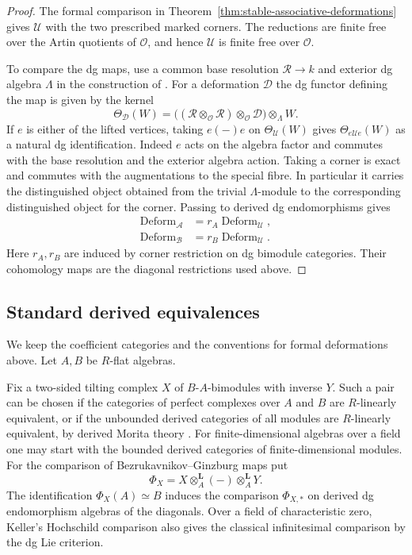 \documentclass[12pt,a4paper,english,reqno]{amsart}
\numberwithin{equation}{section}
\theoremstyle{plain}
\theoremstyle{definition}
\begin{document}
\begin{proof}
The formal comparison in Theorem~\ref{thm:stable-associative-deformations}
gives $\mathcal U$ with the two prescribed marked corners.
The reductions are finite free over the Artin quotients of
$\mathcal O$, and hence $\mathcal U$ is finite free over
$\mathcal O$.

To compare the dg maps, use a common base resolution
$\mathcal R\to k$ and exterior dg algebra $\Lambda$ in the
construction of \cite[(3.1.4)--(3.1.6)]{BezrukavnikovGinzburg2007}.
For a deformation $\mathcal D$ the dg functor defining the
map is given by the kernel
\[
 \Theta_{\mathcal D}(W)
   =\big((\mathcal R\otimes_{\mathcal O}\mathcal R)
                           \otimes_{\mathcal O}\mathcal D\big)
                      \otimes_\Lambda W.
\]
If $e$ is either of the lifted vertices, taking $e(-)e$ on
$\Theta_{\mathcal U}(W)$ gives
$\Theta_{e\mathcal Ue}(W)$ as a natural dg identification.
Indeed $e$ acts on the algebra factor and commutes with the
base resolution and the exterior algebra action. Taking a
corner is exact and commutes with the augmentations to the
special fibre. In particular it carries the distinguished
object obtained from the trivial $\Lambda$-module to the
corresponding distinguished object for the corner. Passing to
derived dg endomorphisms gives
\[
\begin{split}
 \operatorname{Deform}_{\mathcal A}&=r_A\operatorname{Deform}_{\mathcal U},\\
 \operatorname{Deform}_{\mathcal B}&=r_B\operatorname{Deform}_{\mathcal U}.
\end{split}
\]
Here $r_A,r_B$ are induced by corner restriction on dg bimodule
categories. Their cohomology maps are the diagonal restrictions
used above.
\end{proof}

\subsection{Standard derived equivalences}
\label{subsec:standard-derived-deformations}

We keep the coefficient categories and the conventions for
formal deformations above. Let $A,B$ be $R$-flat algebras.

Fix a two-sided tilting complex $X$ of $B$-$A$-bimodules
with inverse $Y$. Such a pair can be chosen if the categories
of perfect complexes over $A$ and $B$ are $R$-linearly equivalent,
or if the unbounded derived categories of all modules are
$R$-linearly equivalent, by derived Morita theory
\cite{RickardDerived1989,anu-Rickard1991,Keller1994Deriving}.
For finite-dimensional algebras over a field one may start with
the bounded derived categories of finite-dimensional modules.
For the comparison of Bezrukavnikov--Ginzburg maps put
\[
 \Phi_X=X\otimes_A^{\mathbf L}(-)\otimes_A^{\mathbf L}Y.
\]
The identification $\Phi_X(A)\simeq B$ induces the comparison
$\Phi_{X,*}$ on derived dg endomorphism algebras of the diagonals.
Over a field of characteristic zero, Keller's Hochschild
comparison \cite[Section~4.6]{Keller2003Higher} also gives the
classical infinitesimal comparison by the dg Lie criterion.
\end{document}
